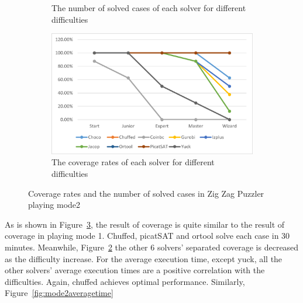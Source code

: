 \begin{figure}[htbp]
\begin{subfigure}[b]{0.48\textwidth}
    \caption{The number of solved cases of each solver for different difficulties}
    \label{fig:mode2eva3}
    \end{subfigure}
    \begin{subfigure}[b]{0.48\textwidth}
    \includegraphics[width=\textwidth]{figs/mode2seperatedcoverage.png}
    \caption{The coverage rates of each solver for different difficulties}
    \label{fig:mode2eva4}
    \end{subfigure}
    \caption{Coverage rates and the number of solved cases in Zig Zag Puzzler playing mode2}
    \label{fig:comparisonmode2}
\end{figure}
As is shown in Figure~\ref{fig:comparisonmode2}, the result of coverage is quite similar to the result of coverage in playing mode 1. Chuffed, picatSAT and ortool solve each case in 30 minutes. Meanwhile, Figure~\ref{fig:mode2eva4} the other 6 solvers' separated coverage is decreased as the difficulty increase.
For the average execution time, except yuck, all the other solvers' average execution times are a positive correlation with the difficulties. Again, chuffed achieves optimal performance. 
Similarly, Figure~\ref{fig:mode2averagetime} 
